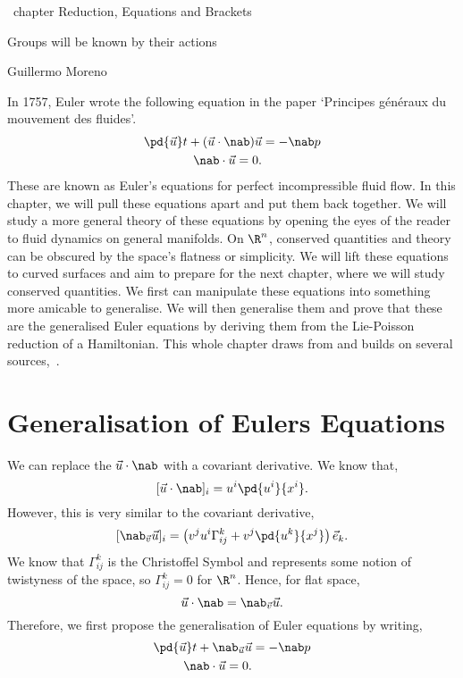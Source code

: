 
\ chapter {Reduction, Equations and Brackets}
\epigraph{Groups will be known by their actions}{Guillermo Moreno}

\noindent
In 1757, Euler wrote the following equation in the paper `Principes g\'en\'eraux du mouvement des fluides'.
\begin{align*}
  \pd {\vec u} t + ({\vec u} \cdot\nab){\vec u} &= - \nab p\\
  \nab \cdot {\vec u} = 0.
\end{align*}
These are known as Euler's equations for perfect incompressible fluid flow. In this chapter, we will pull these equations apart and put them back together. We will study a more general theory of these equations by opening the eyes of the reader to fluid dynamics on general manifolds. On $\R^n$, conserved quantities and theory can be obscured by the space's flatness or simplicity. We will lift these equations to curved surfaces and aim to prepare for the next chapter, where we will study conserved quantities. We first can manipulate these equations into something more amicable to generalise. We will then generalise them and prove that these are the generalised Euler equations by deriving them from the Lie-Poisson reduction of a Hamiltonian. This whole chapter draws from and builds on several sources,~\cite{tmih,holm,arthur,holm1998eulerpoincare,gary_fluids,gaybalmaz2009geometric,Kolev_2007,diffeost,shkoller2000incompressible,marsden1999geometry,vasylkevych2007liepoisson}.

\section{Generalisation of Eulers Equations}
\noindent
We can replace the $\vec u \cdot \nab$ with a covariant derivative. We know that,
$$ [\vec u \cdot \nab]_i = u^i \pd {u^i} {x^i}. $$
However, this is very similar to the covariant derivative,
$$ [\nab_{\vec v}\vec u]_i = \left(v^ju^i\Gamma_{ij}^k + v^j \pd {u^k}{x^j}\right)\vec e_k. $$
We know that $\Gamma_{ij}^k$ is the Christoffel Symbol and represents some notion of twistyness of the space, so $\Gamma_{ij}^k = 0$ for $\R^n$. Hence, for flat space,
$$ \vec u \cdot \nab = \nab_{\vec v}\vec u. $$
Therefore, we first propose the generalisation of Euler equations by writing,
\begin{equation}
  \begin{split}
    \pd {\vec u} t + \nab_{\vec u}{\vec u} &= - \nab p\\
    \nab \cdot {\vec u} = 0.
  \end{split}
  \label{eq:CVDEulerEqns}
\end{equation}

